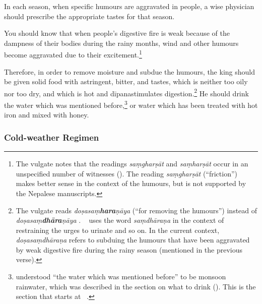 \begin{translation}
	\item [4]
	In each season, when specific humours are aggravated in people, a wise physician should prescribe the appropriate tastes for that season.

	\item [5] %
	You should know that when people's digestive fire is weak because of the dampness of their bodies during the rainy months, wind and other humours become aggravated due to their excitement.\footnote{%
		The vulgate notes that the readings \emph{saṃgharṣāt} and \emph{saṃharṣāt} occur in an unspecified number of witnesses (\cite[809, n.\,2]{vulgate}). The reading \emph{saṃgharṣāt} (``friction'') makes better sense in the context of the humours, but is not supported by the Nepalese manuscripts.}

	\item [6--8ab]
	Therefore, in order to remove moisture and subdue the humours,
	the king should be given solid food with astringent, bitter, and  tastes, which is neither too oily nor too dry, and which is hot and \se
	{dīpana}{stimulates digestion}.\footnote{%
		The vulgate reads \emph{doṣasaṃ\textbf{hara}ṇāya} (``for removing the humours'') instead of \emph{doṣasaṃ\textbf{dhāra}ṇāya} \citep[809]{vulgate}. \CS\  uses the word \emph{saṃdhāraṇa} in the context of restraining the urges to urinate and so on. In the current context, \emph{doṣasaṃdhāraṇa} refers to subduing the humours that have been aggravated by weak digestive fire during the rainy season (mentioned in the previous verse).}
	He should drink the water which was mentioned before,\footnote{%
		 understood “the water which was mentioned before” to be monsoon rainwater, which was described in the section on what to drink (). This is the section that starts at \SS\ .} %
	or water which has been treated with hot iron %
	and mixed with honey.%



	\subsubsection{Cold-weather Regimen} %


\end{translation}
